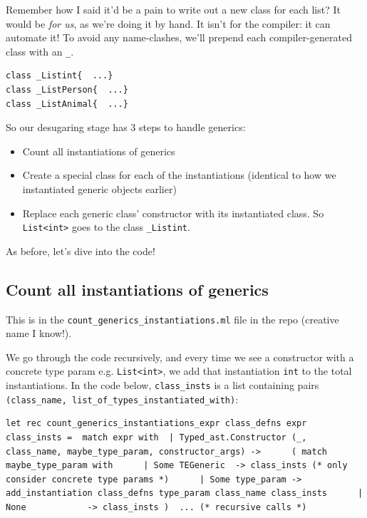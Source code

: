 Remember how I said it'd be a pain to write out a new class for each
list? It would be \emph{for us}, as we're doing it by hand. It isn't for
the compiler: it can automate it! To avoid any name-clashes, we'll
prepend each compiler-generated class with an \texttt{\_}.


\begin{verbatim}
class _Listint{  ...}
class _ListPerson{  ...}
class _ListAnimal{  ...}
\end{verbatim}

So our desugaring stage has 3 steps to handle generics:

\begin{itemize}
\item
  Count all instantiations of generics
\item
  Create a special class for each of the instantiations (identical to
  how we instantiated generic objects earlier)
\item
  Replace each generic class' constructor with its instantiated class.
  So \texttt{List\textless{}int\textgreater{}} goes to the class
  \texttt{\_Listint}.
\end{itemize}

As before, let's dive into the code!

\hypertarget{count-all-instantiations-of-generics}{%
\subsection{\texorpdfstring{\protect\hyperlink{count-all-instantiations-of-generics}{}Count
all instantiations of
generics}{Count all instantiations of generics}}\label{count-all-instantiations-of-generics}}

This is in the \texttt{count\_generics\_instantiations.ml} file in the
repo (creative name I know!).

We go through the code recursively, and every time we see a constructor
with a concrete type param e.g.
\texttt{List\textless{}int\textgreater{}}, we add that instantiation
\texttt{int} to the total instantiations. In the code below,
\texttt{class\_insts} is a list containing pairs
\texttt{(class\_name,\ list\_of\_types\_instantiated\_with)}:

%

\begin{lstlisting}[language=caml,caption={count\_generics\_instantiations.ml}]
let rec count_generics_instantiations_expr class_defns expr class_insts =  match expr with  | Typed_ast.Constructor (_, class_name, maybe_type_param, constructor_args) ->      ( match maybe_type_param with      | Some TEGeneric  -> class_insts (* only consider concrete type params *)      | Some type_param -> add_instantiation class_defns type_param class_name class_insts      | None            -> class_insts )  ... (* recursive calls *)
\end{lstlisting}

